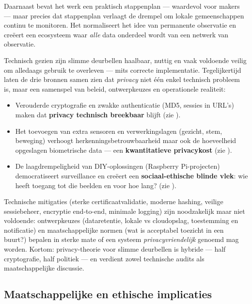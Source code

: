 \documentclass[nonacm,sigconf]{acmart}
\begin{document}
    \noindent
    Daarnaast bevat het werk een praktisch stappenplan — waardevol voor makers — maar precies dat stappenplan verlaagt de drempel om lokale gemeenschappen continu te monitoren. Het normaliseert het idee van permanente observatie en creëert een ecosysteem waar \emph{alle} data onderdeel wordt van een netwerk van observatie.

    \bigskip

    \noindent Technisch gezien zijn slimme deurbellen haalbaar, nuttig en vaak voldoende veilig om alledaags gebruik te overleven — mits correcte implementatie. Tegelijkertijd laten de drie bronnen samen zien dat \emph{privacy} niet één enkel technisch probleem is, maar een samenspel van beleid, ontwerpkeuzes en operationele realiteit:
    \begin{itemize}
        \item Verouderde cryptografie en zwakke authenticatie (MD5, sessies in URL's) maken dat \textbf{privacy technisch breekbaar} blijft (zie \parencite{liu2021ethical}).
        \item Het toevoegen van extra sensoren en verwerkingslagen (gezicht, stem, beweging) verhoogt herkenningsbetrouwbaarheid maar ook de hoeveelheid opgeslagen biometrische data — een \textbf{kwantitatieve privacykost} (zie \parencite{chaudhari2020smart}).
        \item De laagdrempeligheid van DIY-oplossingen (Raspberry Pi-projecten) democratiseert surveillance en creëert een \textbf{sociaal-ethische blinde vlek}: wie heeft toegang tot die beelden en voor hoe lang? (zie \parencite{lalitha2019smart}).
    \end{itemize}

    \noindent
    Technische mitigaties (sterke certificaatvalidatie, moderne hashing, veilige sessiebeheer, encryptie end-to-end, minimale logging) zijn noodzakelijk maar niet voldoende: ontwerpkeuzes (dataretentie, lokale vs cloudopslag, toestemming en notificatie) en maatschappelijke normen (wat is acceptabel toezicht in een buurt?) bepalen in sterke mate of een systeem \emph{privacyvriendelijk} genoemd mag worden. Kortom: privacy-theorie voor slimme deurbellen is hybride — half cryptografie, half politiek — en verdient zowel technische audits als maatschappelijke discussie.

    \subsection{Maatschappelijke en ethische implicaties}
\end{document}

